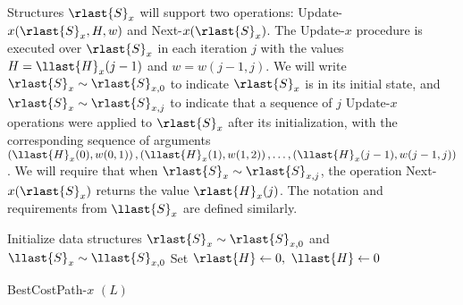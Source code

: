 Structures $\rlast{S}_x$ will support two operations: Update-$x(\rlast{S}_x, H, w)$ and Next-$x(\rlast{S}_x)$. The Update-$x$ procedure is executed over $\rlast{S}_x$ in each iteration $j$ with the values $H = \llast{H}_x(j-1)$ and $w = w(j-1, j)$. We will write $\rlast{S}_x \sim \rlast{S}_{x, 0}$ to indicate $\rlast{S}_x$ is in its initial state, and $\rlast{S}_x \sim \rlast{S}_{x, j}$ to indicate that a sequence of $j$ Update-$x$ operations were applied to $\rlast{S}_x$ after its initialization, with the corresponding sequence of arguments $\left(\llast{H}_x(0), w(0, 1)\right), \left(\llast{H}_x(1), w(1, 2)\right), \ldots, \left(\llast{H}_x(j-1), w(j-1, j)\right)$. We will require that when $\rlast{S}_x \sim \rlast{S}_{x, j}$, the operation Next-$x(\rlast{S}_x)$ returns the value $\rlast{H}_x(j)$. The notation and requirements from $\llast{S}_x$ are defined similarly.


\begin{algorithm}
	Initialize data structures $\rlast{S}_x \sim \rlast{S}_{x, 0}$ and $\llast{S}_x \sim \llast{S}_{x, 0}$\; 
	Set $\rlast{H} \gets 0, \ \llast{H} \gets 0$\;
	\;
	\caption{BestCostPath-$x$ $(L)$}
	\label{algo:H}
\end{algorithm}

